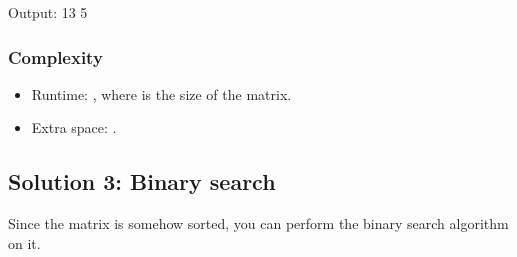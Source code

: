 \documentclass[letterpaper,12pt,english]{book}
\begin{document}
\begin{sphinxVerbatim}[commandchars=\\\{\}]
\end{sphinxVerbatim}

\begin{sphinxVerbatim}[commandchars=\\\{\}]
Output:
13
\PYGZhy{}5
\end{sphinxVerbatim}


\subsubsection{Complexity}
\label{\detokenize{Priority_Queue/378_Kth_Smallest_Element_in_a_Sorted_Matrix:id2}}\begin{itemize}
\item {} 
\sphinxAtStartPar
Runtime: , where  is the size of the matrix.

\item {} 
\sphinxAtStartPar
Extra space: .

\end{itemize}


\subsection{Solution 3: Binary search}
\label{\detokenize{Priority_Queue/378_Kth_Smallest_Element_in_a_Sorted_Matrix:solution-3-binary-search}}
\sphinxAtStartPar
Since the matrix is somehow sorted, you can perform the binary search algorithm on it.
\end{document}
